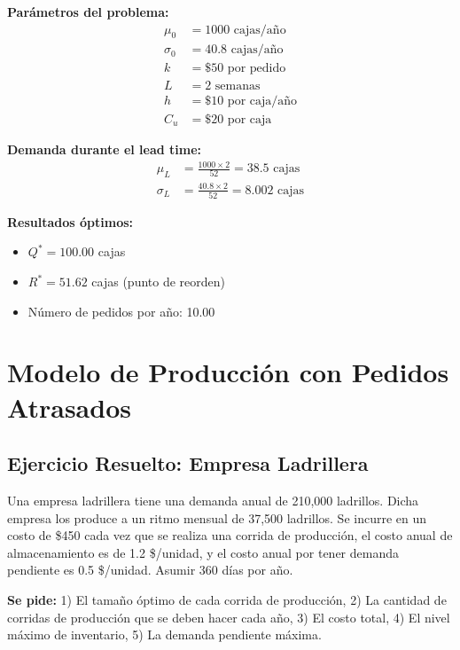 \documentclass[12pt,a4paper]{book}
\begin{document}
	\begin{tcolorbox}[enhanced,colback=azulclaro,colframe=azulprincipal,boxrule=2pt,arc=8pt,
		title={\bfseries\color{white} \faCalculator\ SOLUCIÓN}]
		
		\textbf{Parámetros del problema:}
		\begin{align}
			\mu_0 &= 1000 \text{ cajas/año}\\
			\sigma_0 &= 40.8 \text{ cajas/año}\\
			k &= \$50 \text{ por pedido}\\
			L &= 2 \text{ semanas}\\
			h &= \$10 \text{ por caja/año}\\
			C_u &= \$20 \text{ por caja}
		\end{align}
		
		\textbf{Demanda durante el lead time:}
		\begin{align}
			\mu_L &= \frac{1000 \times 2}{52} = 38.5 \text{ cajas}\\
			\sigma_L &= \frac{40.8 \times 2}{52} = 8.002 \text{ cajas}
		\end{align}
		
		\textbf{Resultados óptimos:}
		\begin{itemize}[leftmargin=*,label=\textcolor{verdeprincipal}{\faCheckCircle}]
			\item $Q^* = 100.00$ cajas
			\item $R^* = 51.62$ cajas (punto de reorden)
			\item Número de pedidos por año: 10.00
		\end{itemize}
		
	\end{tcolorbox}
	
	\section{Modelo de Producción con Pedidos Atrasados}
	
	\subsection{Ejercicio Resuelto: Empresa Ladrillera}
	
	\begin{tcolorbox}[enhanced,colback=naranjaclaro,colframe=naranjaacento,boxrule=2pt,arc=8pt,
		drop shadow,title={\bfseries\color{white} \faPuzzlePiece\ PROBLEMA}]
		
		Una empresa ladrillera tiene una demanda anual de 210,000 ladrillos. Dicha empresa los produce a un ritmo mensual de 37,500 ladrillos. Se incurre en un costo de \$450 cada vez que se realiza una corrida de producción, el costo anual de almacenamiento es de 1.2 \$/unidad, y el costo anual por tener demanda pendiente es 0.5 \$/unidad. Asumir 360 días por año.
		
		\textbf{Se pide:} 1) El tamaño óptimo de cada corrida de producción, 2) La cantidad de corridas de producción que se deben hacer cada año, 3) El costo total, 4) El nivel máximo de inventario, 5) La demanda pendiente máxima.
		
	\end{tcolorbox}
	
\end{document}
